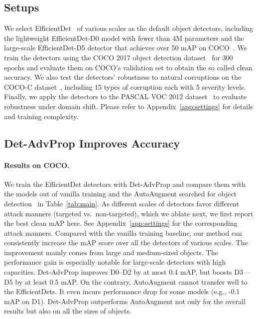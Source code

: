 \documentclass[final]{cvpr}
\begin{document}
\subsection{Setups}
We select EfficientDet~\cite{tan2020edet} of various scales as the default object detectors, including the lightweight EfficientDet-D0 model with fewer than 4M parameters and the large-scale EfficientDet-D5 detector that achieves over 50 mAP on COCO~\cite{lin2015coco}.
We train the detectors using the COCO 2017 object detection dataset~\cite{lin2015coco} for 300 epochs and evaluate them on COCO's validation set to obtain the so called clean accuracy. We also test the detectors' robustness to natural corruptions on the COCO-C dataset~\cite{michaelis2020benchmarking}, including 15 types of corruption each with 5 severity levels. Finally, we apply the detectors to the PASCAL VOC 2012 dataset~\cite{pascal-voc-2012} to evaluate robustness under domain shift. Please refer to Appendix~\ref{app:settings} for details and training complexity.


\subsection{Det-AdvProp Improves Accuracy}
\label{sec:acc}
\paragraph{Results on COCO.}
We train the EfficientDet detectors with Det-AdvProp and compare them with the models out of vanilla training and the AutoAugment searched for object detection~\cite{zoph2019learning} in Table~\ref{tab:main}.
As different scales of detectors favor different attack manners (targeted vs.\ non-targeted), which we ablate next, we first report the best clean mAP here. See Appendix~\ref{app:settings} for the corresponding attack manners. 
Compared with the vanilla training baseline, our method can consistently increase the mAP score over all the detectors of various scales. The improvement mainly comes from large and medium-sized objects.
The performance gain is especially notable for large-scale detectors with high capacities. Det-AdvProp improves D0--D2 by at most 0.4 mAP, but boosts D3---D5 by at least 0.5 mAP. 
On the contrary, AutoAugment cannot transfer well to the EfficientDets.
It even incurs performance drop for some models (e.g., -0.1 mAP on D1).
Det-AdvProp outperforms AutoAugment not only for the overall results but also on all the sizes of objects.
\end{document}
